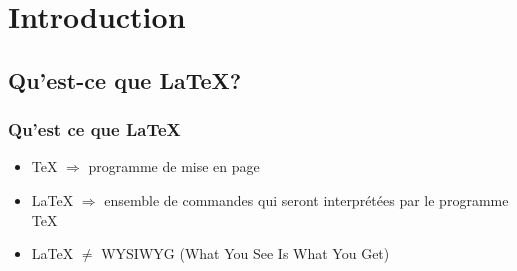 \documentclass[10pt,svgnames,usenames,table]{beamer} %
\begin{document}

\section{Introduction}
\subsection{Qu'est-ce que \LaTeX{}?}
\begin{frame}
\frametitle{Qu'est ce que \LaTeX}

\begin{itemize}
\item \TeX{} $ \Rightarrow$ programme de mise en page
\vspace{0.5cm}
\item \LaTeX{} $ \Rightarrow$ ensemble de commandes qui seront
 interprétées par le programme \TeX
 \vspace{0.5cm}
\item \LaTeX{} $ \neq$ WYSIWYG (What You See Is What You Get)
\end{itemize}

\end{frame}
\end{document}
